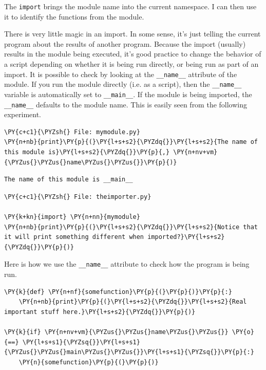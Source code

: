 The \texttt{import} brings the module name into the current namespace.  I can then use it to identify the functions from the module.  


There is very little magic in an import.  In some sense, it’s just telling the current program about the results of another program.  Because the import (usually) results in the module being executed, it’s good practice to change the behavior of a script depending on whether it is being run directly, or being run as part of an import.  It is possible to check by looking at the \texttt{\_\_name\_\_} attribute of the module.  If you run the module directly (i.e. as a script), then the \texttt{\_\_name\_\_} variable is automatically set to \texttt{\_\_main\_\_}.  If the module is being imported, the \texttt{\_\_name\_\_} defaults to the module name.  This is easily seen from the following experiment.


\begin{Verbatim}[commandchars=\\\{\}]
\PY{c+c1}{\PYZsh{} File: mymodule.py}
\PY{n+nb}{print}\PY{p}{(}\PY{l+s+s2}{\PYZdq{}}\PY{l+s+s2}{The name of this module is}\PY{l+s+s2}{\PYZdq{}}\PY{p}{,} \PY{n+nv+vm}{\PYZus{}\PYZus{}name\PYZus{}\PYZus{}}\PY{p}{)}
\end{Verbatim}

\begin{Verbatim}
The name of this module is __main__
\end{Verbatim}

\begin{Verbatim}[commandchars=\\\{\}]
\PY{c+c1}{\PYZsh{} File: theimporter.py}

\PY{k+kn}{import} \PY{n+nn}{mymodule}
\PY{n+nb}{print}\PY{p}{(}\PY{l+s+s2}{\PYZdq{}}\PY{l+s+s2}{Notice that it will print something different when imported?}\PY{l+s+s2}{\PYZdq{}}\PY{p}{)}
\end{Verbatim}



Here is how we use the \texttt{\_\_name\_\_} attribute to check how the program is being run.


\begin{Verbatim}[commandchars=\\\{\}]
\PY{k}{def} \PY{n+nf}{somefunction}\PY{p}{(}\PY{p}{)}\PY{p}{:}
    \PY{n+nb}{print}\PY{p}{(}\PY{l+s+s2}{\PYZdq{}}\PY{l+s+s2}{Real important stuff here.}\PY{l+s+s2}{\PYZdq{}}\PY{p}{)}

\PY{k}{if} \PY{n+nv+vm}{\PYZus{}\PYZus{}name\PYZus{}\PYZus{}} \PY{o}{==} \PY{l+s+s1}{\PYZsq{}}\PY{l+s+s1}{\PYZus{}\PYZus{}main\PYZus{}\PYZus{}}\PY{l+s+s1}{\PYZsq{}}\PY{p}{:}
    \PY{n}{somefunction}\PY{p}{(}\PY{p}{)}
\end{Verbatim}

